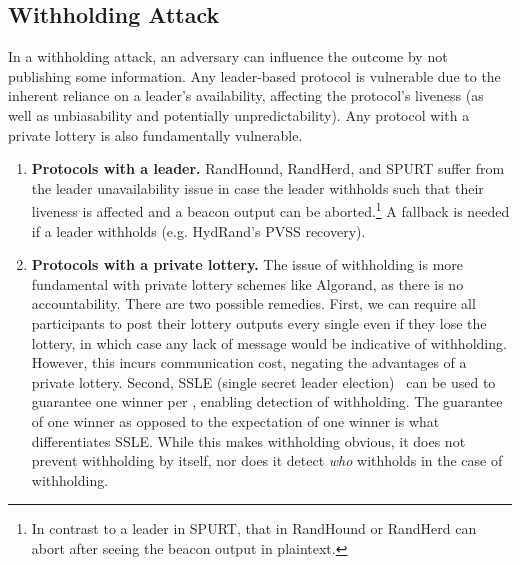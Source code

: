 \subsection{Withholding Attack}
\label{subsection:withholding}
In a withholding attack, an adversary can influence the outcome by not publishing some information. Any leader-based protocol is vulnerable due to the inherent reliance on a leader's availability, affecting the protocol's liveness (as well as unbiasability and potentially unpredictability). Any protocol with a private lottery is also fundamentally vulnerable.
\begin{enumerate}
\item \textbf{Protocols with a leader.} RandHound, RandHerd, and SPURT suffer from the leader unavailability issue in case the leader withholds such that their liveness is affected and a beacon output can be aborted.\footnote{In contrast to a leader in SPURT, that in RandHound or RandHerd can abort after seeing the beacon output in plaintext.}
A fallback is needed if a leader withholds (e.g. HydRand's PVSS recovery).
\item \textbf{Protocols with a private lottery.} The issue of withholding is more fundamental with private lottery schemes like Algorand, as there is no accountability. There are two possible remedies. First, we can require all participants to post their lottery outputs every single \epoch even if they lose the lottery, in which case any lack of message would be indicative of withholding. However, this incurs communication cost, negating the advantages of a private lottery. Second, SSLE (single secret leader election)~\cite{boneh2020single} can be used to guarantee one winner per \epoch, enabling detection of withholding.
The guarantee of one winner as opposed to the expectation of one winner is what differentiates SSLE. While this makes withholding obvious, it does not prevent withholding by itself, nor does it detect \emph{who} withholds in the case of withholding.
\end{enumerate}

